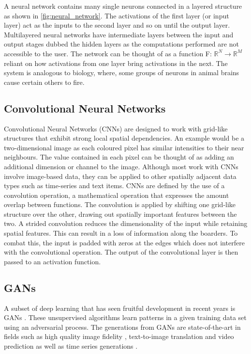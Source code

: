 \documentclass[12pt]{iopart}
\begin{document}
A neural network contains many single neurons connected in a layered structure as shown in \cref{fig:neural_network}. The activations of the first layer (or input layer) act as the inputs to the second layer and so on until the output layer. Multilayered neural networks have intermediate layers between the input and output stages dubbed the hidden layers as the computations performed are not accessible to the user. The network can be thought of as a function F: $\mathbb{R}^N\rightarrow \mathbb{R}^M $ reliant on how activations from one layer bring activations in the next. The system is analogous to biology, where, some groups of neurons in animal brains cause certain others to fire. 

\subsection{Convolutional Neural Networks}
Convolutional Neural Networks (CNNs) are designed to work with grid-like structures that exhibit strong local spatial dependencies. An example would be a two-dimensional image as each coloured pixel has similar intensities to their near neighbours. The value contained in each pixel can be thought of as adding an additional dimension or channel to the image. Although most work with CNNs involve image-based data, they can be applied to other spatially adjacent data types such as time-series and text items. CNNs are defined by the use of a convolution operation, a mathematical operation that expresses the amount overlap between functions. The convolution is applied by shifting one grid-like structure over the other, drawing out spatially important features between the two.  A strided convolution reduces the dimensionality of the input while retaining spatial features. This can result in a loss of information along the boarders. To combat this, the input is padded with zeros at the edges which does not interfere with the convolutional operation. The output of the convolutional layer is then passed to an activation function. 

\subsection{GANs}

A subset of deep learning that has seen fruitful development in recent years is \acp{GAN} \cite{Goodfellow2014}. These unsupervised algorithms learn
patterns in a given training data set using an adversarial process. The
generations from \acp{GAN} are state-of-the-art in fields such as high quality image
fidelity \cite{brock2018large,karras2019analyzing}, text-to-image translation
\cite{reed2016generative} and video prediction \cite{liang2017dual} as well as
time series generations \cite{esteban2017realvalued}. 
\end{document}
